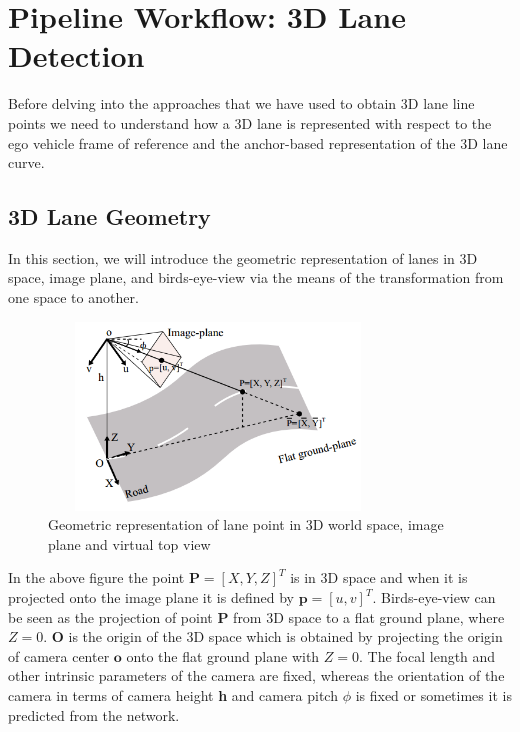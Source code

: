         
        \section{Pipeline Workflow: 3D Lane Detection }
        Before delving into the approaches that we have used to obtain 3D lane line points we need to understand how a 3D lane is represented with respect to the ego vehicle frame of reference and the anchor-based representation of the 3D lane curve.  
        
        \subsection{3D Lane Geometry}
        In this section, we will introduce the geometric representation of lanes in 3D space, image plane, and birds-eye-view via the means of the transformation from one space to another. 
        
         \begin{figure}[h]
    \centering
    \includegraphics[width=9cm, height=5cm]{images/3d_lane_geometry.png}
    \caption{Geometric representation of lane point in 3D world space, image plane and virtual top view \cite{DBLP:journals/corr/abs-2112-15351}}
    \end{figure}
    
    In the above figure the point $\textbf{P} =[X, Y, Z]^{T}$ is in 3D space and when it is projected onto the image plane it is defined by $\textbf{p} = [u, v]^{T}$. Birds-eye-view can be seen as the projection of point $\textbf{P}$ from 3D space to a flat ground plane, where $Z=0$. $\textbf{O}$ is the origin of the 3D space which is obtained by projecting the origin of camera center $\textbf{o}$ onto the flat ground plane with $Z = 0$. The focal length and other intrinsic parameters of the camera are fixed, whereas the orientation of the camera in terms of camera height \textbf{h}  and camera pitch \textbf{$\phi$} is fixed or sometimes it is predicted from the network. 
    
